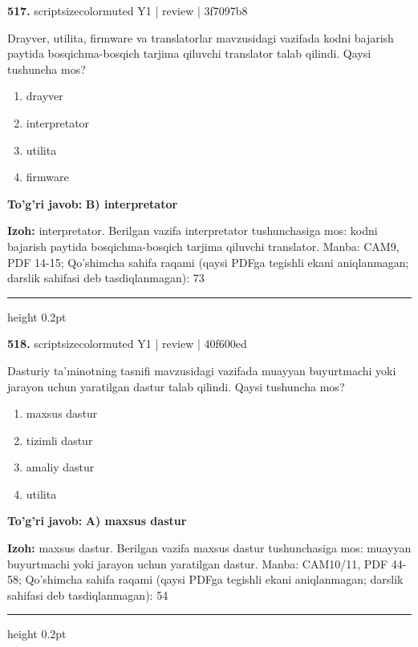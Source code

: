 \documentclass[10pt,a4paper]{article}
\begin{document}
{\bfseries\sffamily\color{ink} 517.} {scriptsizecolor{muted} Y1 | review | 3f7097b8}
\par
Drayver, utilita, firmware va translatorlar mavzusidagi vazifada kodni bajarish paytida bosqichma-bosqich tarjima qiluvchi translator talab qilindi. Qaysi tushuncha mos?
\begin{enumerate}[label=\Alph*),leftmargin=9mm]
\item drayver
\item interpretator
\item utilita
\item firmware
\end{enumerate}
\begin{tcolorbox}[enhanced,breakable,colback=teal!4,colframe=teal!60!black,boxrule=0.45pt,arc=1.2mm,left=2.7mm,right=2.7mm,top=1.8mm,bottom=1.8mm,before skip=2mm,after skip=2mm]
{\bfseries\sffamily\color{teal}To'g'ri javob:} \textbf{B) interpretator}
\par\smallskip
{\bfseries Izoh:} interpretator. Berilgan vazifa interpretator tushunchasiga mos: kodni bajarish paytida bosqichma-bosqich tarjima qiluvchi translator. Manba: CAM9, PDF 14-15; Qo'shimcha sahifa raqami (qaysi PDFga tegishli ekani aniqlanmagan; darslik sahifasi deb tasdiqlanmagan): 73
\end{tcolorbox}
\vspace{2mm}\hrule height 0.2pt\vspace{3mm}

{\bfseries\sffamily\color{ink} 518.} {scriptsizecolor{muted} Y1 | review | 40f600ed}
\par
Dasturiy ta'minotning tasnifi mavzusidagi vazifada muayyan buyurtmachi yoki jarayon uchun yaratilgan dastur talab qilindi. Qaysi tushuncha mos?
\begin{enumerate}[label=\Alph*),leftmargin=9mm]
\item maxsus dastur
\item tizimli dastur
\item amaliy dastur
\item utilita
\end{enumerate}
\begin{tcolorbox}[enhanced,breakable,colback=teal!4,colframe=teal!60!black,boxrule=0.45pt,arc=1.2mm,left=2.7mm,right=2.7mm,top=1.8mm,bottom=1.8mm,before skip=2mm,after skip=2mm]
{\bfseries\sffamily\color{teal}To'g'ri javob:} \textbf{A) maxsus dastur}
\par\smallskip
{\bfseries Izoh:} maxsus dastur. Berilgan vazifa maxsus dastur tushunchasiga mos: muayyan buyurtmachi yoki jarayon uchun yaratilgan dastur. Manba: CAM10/11, PDF 44-58; Qo'shimcha sahifa raqami (qaysi PDFga tegishli ekani aniqlanmagan; darslik sahifasi deb tasdiqlanmagan): 54
\end{tcolorbox}
\vspace{2mm}\hrule height 0.2pt\vspace{3mm}
\end{document}
